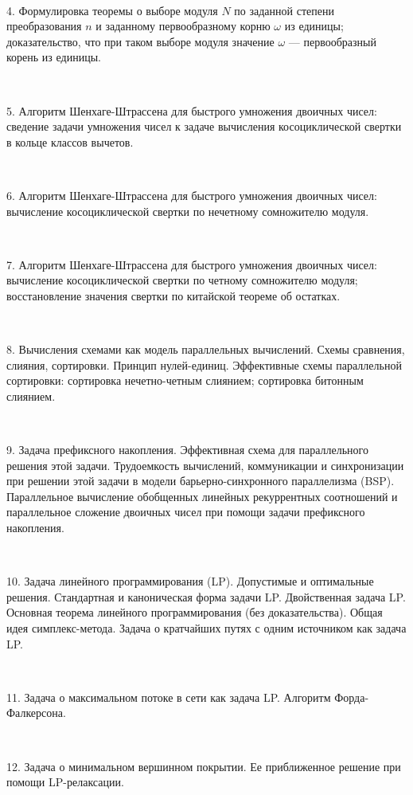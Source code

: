 \documentclass[a4paper]{article}
\theoremstyle{indented}
\theoremstyle{definition}
\theoremstyle{remark}
\begin{document}
\ 

4. Формулировка теоремы о выборе модуля $N$ по заданной степени преобразования $n$ и заданному первообразному корню $\omega$ из единицы; доказательство, что при таком выборе модуля значение $\omega$ --- первообразный корень из единицы.

\ 

5. Алгоритм Шенхаге-Штрассена для быстрого умножения двоичных чисел: сведение задачи умножения чисел к задаче вычисления косоциклической свертки в кольце классов вычетов.

\ 

6. Алгоритм Шенхаге-Штрассена для быстрого умножения двоичных чисел: вычисление косоциклической свертки по нечетному сомножителю модуля.

\ 

7. Алгоритм Шенхаге-Штрассена для быстрого умножения двоичных чисел: вычисление косоциклической свертки по четному сомножителю модуля; восстановление значения свертки по китайской теореме об остатках.

\ 

8. Вычисления схемами как модель параллельных вычислений. Схемы сравнения, слияния, сортировки. Принцип нулей-единиц. Эффективные схемы параллельной сортировки: сортировка нечетно-четным слиянием; сортировка битонным слиянием.

\ 

9. Задача префиксного накопления. Эффективная схема для параллельного решения этой задачи. Трудоемкость вычислений, коммуникации и синхронизации при решении этой задачи в модели барьерно-синхронного параллелизма (BSP). Параллельное вычисление обобщенных линейных рекуррентных соотношений и параллельное сложение двоичных чисел при помощи задачи префиксного накопления.

\ 

10. Задача линейного программирования (LP). Допустимые и оптимальные решения. Стандартная и каноническая форма задачи LP. Двойственная задача LP. Основная теорема линейного программирования (без доказательства). Общая идея симплекс-метода. Задача о кратчайших путях с одним источником как задача LP.

\ 

11. Задача о максимальном потоке в сети как задача LP. Алгоритм Форда-Фалкерсона.

\ 

12. Задача о минимальном вершинном покрытии. Ее приближенное решение при помощи LP-релаксации.
 
\ 
\end{document}
